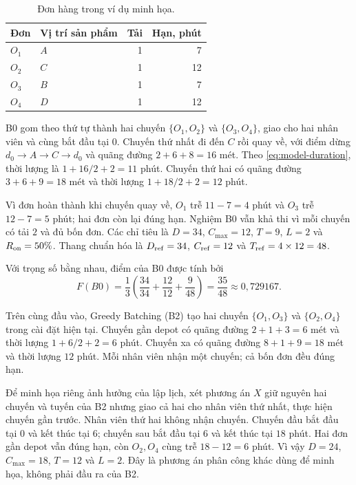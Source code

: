\begin{table}[H]
\centering\small
\begin{tabular}{llrr}
\toprule
Đơn & Vị trí sản phẩm & Tải & Hạn, phút \\
\midrule
$O_1$ & $A$ & 1 & 7 \\
$O_2$ & $C$ & 1 & 12 \\
$O_3$ & $B$ & 1 & 7 \\
$O_4$ & $D$ & 1 & 12 \\
\bottomrule
\end{tabular}
\caption{Đơn hàng trong ví dụ minh họa.}\label{tab:example-orders}
\end{table}

B0 gom theo thứ tự thành hai chuyến $\{O_1,O_2\}$ và $\{O_3,O_4\}$, giao cho hai nhân viên và cùng bắt đầu tại $0$. Chuyến thứ nhất đi đến $C$ rồi quay về, với điểm dừng $d_0\to A\to C\to d_0$ và quãng đường $2+6+8=16$ mét. Theo \eqref{eq:model-duration}, thời lượng là $1+16/2+2=11$ phút. Chuyến thứ hai có quãng đường $3+6+9=18$ mét và thời lượng $1+18/2+2=12$ phút.

Vì đơn hoàn thành khi chuyến quay về, $O_1$ trễ $11-7=4$ phút và $O_3$ trễ $12-7=5$ phút; hai đơn còn lại đúng hạn. Nghiệm B0 vẫn khả thi vì mỗi chuyến có tải $2$ và đủ bốn đơn. Các chỉ tiêu là $D=34$, $C_{\max}=12$, $T=9$, $L=2$ và $R_{\rm on}=50\%$. Thang chuẩn hóa là $D_{\rm ref}=34$, $C_{\rm ref}=12$ và $T_{\rm ref}=4\times12=48$.

Với trọng số bằng nhau, điểm của B0 được tính bởi
\begin{equation}
 F(B0)=\frac13\left(\frac{34}{34}+\frac{12}{12}+\frac9{48}\right)
 =\frac{35}{48}\approx0{,}729167.\label{eq:model-example-b0}
\end{equation}

Trên cùng đầu vào, Greedy Batching (B2) tạo hai chuyến $\{O_1,O_3\}$ và $\{O_2,O_4\}$ trong cài đặt hiện tại. Chuyến gần depot có quãng đường $2+1+3=6$ mét và thời lượng $1+6/2+2=6$ phút. Chuyến xa có quãng đường $8+1+9=18$ mét và thời lượng $12$ phút. Mỗi nhân viên nhận một chuyến; cả bốn đơn đều đúng hạn.

Để minh họa riêng ảnh hưởng của lập lịch, xét phương án $X$ giữ nguyên hai chuyến và tuyến của B2 nhưng giao cả hai cho nhân viên thứ nhất, thực hiện chuyến gần trước. Nhân viên thứ hai không nhận chuyến. Chuyến đầu bắt đầu tại $0$ và kết thúc tại $6$; chuyến sau bắt đầu tại $6$ và kết thúc tại $18$ phút. Hai đơn gần depot vẫn đúng hạn, còn $O_2,O_4$ cùng trễ $18-12=6$ phút. Vì vậy $D=24$, $C_{\max}=18$, $T=12$ và $L=2$. Đây là phương án phân công khác dùng để minh họa, không phải đầu ra của B2.

